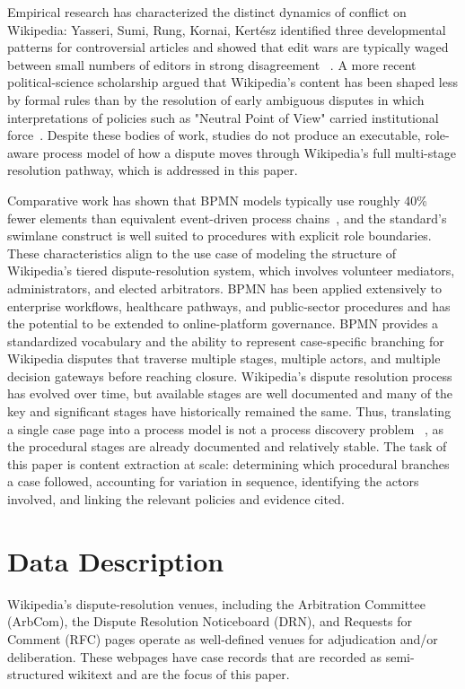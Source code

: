 \documentclass[conference]{IEEEtran}
\begin{document}
Empirical research has characterized the distinct dynamics of conflict on Wikipedia: Yasseri, Sumi, Rung, Kornai, Kertész identified three developmental patterns for controversial articles and showed that edit wars are typically waged between small numbers of editors in strong disagreement ~\cite{b4}. A more recent political-science scholarship argued that Wikipedia's content has been shaped less by formal rules than by the resolution of early ambiguous disputes in which interpretations of policies such as "Neutral Point of View" carried institutional force~\cite{b5}. Despite these bodies of work, studies do not produce an executable, role-aware process model of how a dispute moves through Wikipedia's full multi-stage resolution pathway, which is addressed in this paper.

Comparative work has shown that BPMN models typically use roughly 40\% fewer elements than equivalent event-driven process chains~\cite{b6}, and the standard's swimlane construct is well suited to procedures with explicit role boundaries. These characteristics align to the use case of modeling the structure of Wikipedia's tiered dispute-resolution system, which involves volunteer mediators, administrators, and elected arbitrators. BPMN has been applied extensively to enterprise workflows, healthcare pathways, and public-sector procedures and has the potential to be extended to online-platform governance. BPMN provides a standardized vocabulary and the ability to represent case-specific branching for Wikipedia disputes that traverse multiple stages, multiple actors, and multiple decision gateways before reaching closure. Wikipedia's dispute resolution process has evolved over time, but available stages are well documented and many of the key and significant stages have historically remained the same. Thus, translating a single case page into a process model is not a process discovery problem ~\cite{b7}, as the procedural stages are already documented and relatively stable. The task of this paper is content extraction at scale: determining which procedural branches a case followed, accounting for variation in sequence, identifying the actors involved, and linking the relevant policies and evidence cited.

\section{Data Description}
Wikipedia's dispute-resolution venues, including the Arbitration Committee (ArbCom), the Dispute Resolution Noticeboard (DRN), and Requests for Comment (RFC) pages operate as well-defined venues for adjudication and/or deliberation. These webpages have case records that are recorded as semi-structured wikitext and are the focus of this paper.
\end{document}
